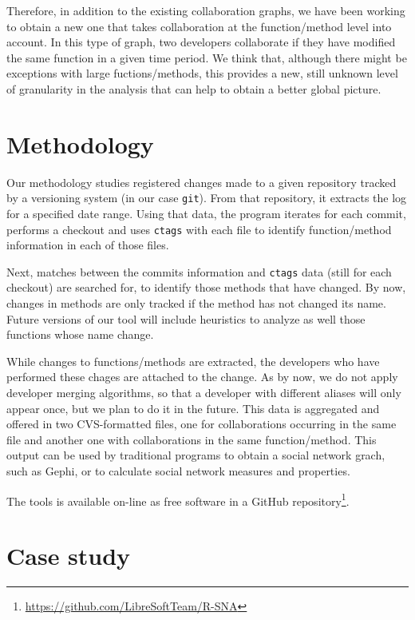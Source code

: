 \documentclass[a4paper]{article}
\begin{document}
Therefore, in addition to the existing collaboration graphs, we have been working
to obtain a new one that takes collaboration at the function/method level into
account. In this type of graph, two developers collaborate if they have modified
the same function in a given time period. We think that, although there might
be exceptions with large fuctions/methods, this provides a new, still unknown
level of granularity in the analysis that can help to obtain a better global 
picture.

\section{Methodology}

Our methodology studies registered changes made to a given repository tracked by
a versioning system (in our case \texttt{git}). 
From that repository, it extracts the log for a specified date range. Using
that data, the program iterates for each commit, performs a checkout
and uses \texttt{ctags} with each file to identify function/method information
in each of those files.

Next, matches between the commits information and \texttt{ctags} data
(still for each checkout) are searched for, to identify those methods that have
changed. By now, changes in methods are only tracked if the method has not 
changed its name. Future versions of our tool will include heuristics to analyze
as well those functions whose name change.

While changes to functions/methods are extracted, the developers who have performed
these chages are attached to the change. As by now, we do not apply developer merging
algorithms, so that a developer with different aliases will only appear once,
but we plan to do it in the future. This data is aggregated and offered
in two CVS-formatted files, one for collaborations occurring in the same file
and another one with collaborations in the same function/method. This output
can be used by traditional programs to obtain a social network grach, such as
Gephi, or to calculate social network measures and properties.

The tools is available on-line as free software in a GitHub repository\footnote{\url{https://github.com/LibreSoftTeam/R-SNA}}.

\section{Case study}
\end{document}
